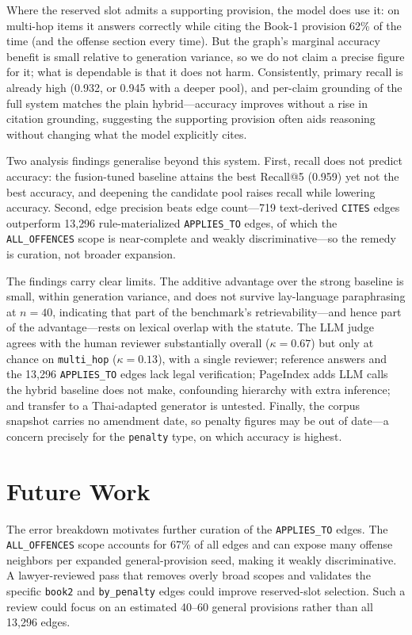 \documentclass[conference]{IEEEtran}
\begin{document}
Where the reserved slot admits a supporting provision, the model does use it: on multi-hop items it
answers correctly while citing the Book-1 provision 62\% of the time (and the offense section every
time). But the graph's marginal accuracy benefit is small relative to generation variance, so we do
not claim a precise figure for it; what is dependable is that it does not harm. Consistently, primary
recall is already high (0.932, or 0.945 with a deeper pool), and per-claim grounding of the full
system matches the plain hybrid---accuracy improves without a rise in citation grounding, suggesting
the supporting provision often aids reasoning without changing what the model explicitly cites.

Two analysis findings generalise beyond this system. First, recall does not predict accuracy: the
fusion-tuned baseline attains the best Recall@5 (0.959) yet not the best accuracy, and deepening the
candidate pool raises recall while lowering accuracy. Second, edge precision beats edge count---719
text-derived \texttt{CITES} edges outperform 13{,}296 rule-materialized \texttt{APPLIES\_TO} edges,
of which the \texttt{ALL\_OFFENCES} scope is near-complete and weakly discriminative---so the remedy
is curation, not broader expansion.

The findings carry clear limits. The additive advantage over the strong baseline is small, within
generation variance, and does not survive lay-language paraphrasing at $n=40$, indicating that part
of the benchmark's retrievability---and hence part of the advantage---rests on lexical overlap with
the statute. The LLM judge agrees with the human reviewer substantially overall ($\kappa=0.67$) but
only at chance on \texttt{multi\_hop} ($\kappa=0.13$), with a single reviewer; reference answers and
the 13{,}296 \texttt{APPLIES\_TO} edges lack legal verification; PageIndex adds LLM calls the hybrid
baseline does not make, confounding hierarchy with extra inference; and transfer to a Thai-adapted
generator is untested. Finally, the corpus snapshot carries no amendment date, so penalty figures may
be out of date---a concern precisely for the \texttt{penalty} type, on which accuracy is highest.

\section{Future Work}

The error breakdown motivates further curation of the \texttt{APPLIES\_TO} edges. The
\texttt{ALL\_OFFENCES} scope accounts for 67\% of all
edges and can expose many offense neighbors per expanded general-provision seed, making it weakly
discriminative. A
lawyer-reviewed pass that removes overly broad scopes and validates the specific \texttt{book2} and
\texttt{by\_penalty} edges could improve reserved-slot selection. Such a review could focus on an
estimated 40--60 general provisions rather than all 13,296 edges.
\end{document}
